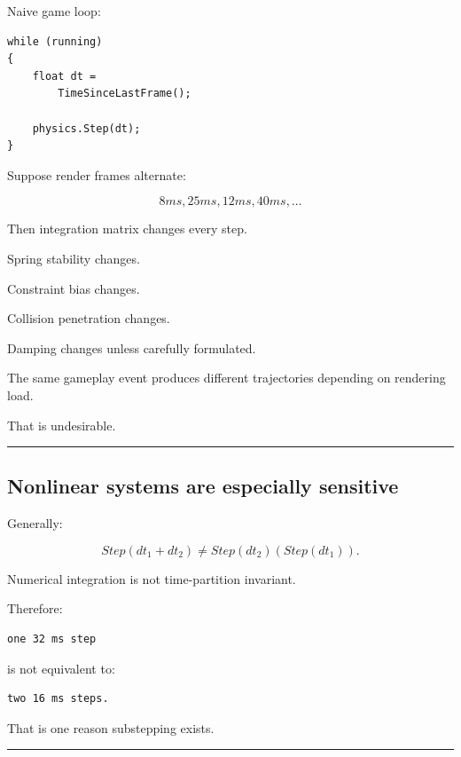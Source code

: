 \hypertarget{06-engine-ii-ch037-part-1672-variable-timestep-instability}{}

Naive game loop:

\begin{verbatim}
while (running)
{
    float dt =
        TimeSinceLastFrame();

    physics.Step(dt);
}
\end{verbatim}

Suppose render frames alternate:

\[
8ms,25ms,12ms,40ms,\dots
\]

Then integration matrix changes every step.

Spring stability changes.

Constraint bias changes.

Collision penetration changes.

Damping changes unless carefully formulated.

The same gameplay event produces different trajectories depending on rendering load.

That is undesirable.

\begin{center}\rule{0.5\linewidth}{0.5pt}\end{center}

\subsection{Nonlinear systems are especially sensitive}\label{06-engine-ii-ch037-nonlinear-systems-are-especially-sensitive}

\hypertarget{06-engine-ii-ch037-nonlinear-systems-are-especially-sensitive}{}

Generally:

\[
Step(dt_1+dt_2)
\neq
Step(dt_2)(Step(dt_1)).
\]

Numerical integration is not time-partition invariant.

Therefore:

\begin{verbatim}
one 32 ms step
\end{verbatim}

is not equivalent to:

\begin{verbatim}
two 16 ms steps.
\end{verbatim}

That is one reason substepping exists.

\begin{center}\rule{0.5\linewidth}{0.5pt}\end{center}

